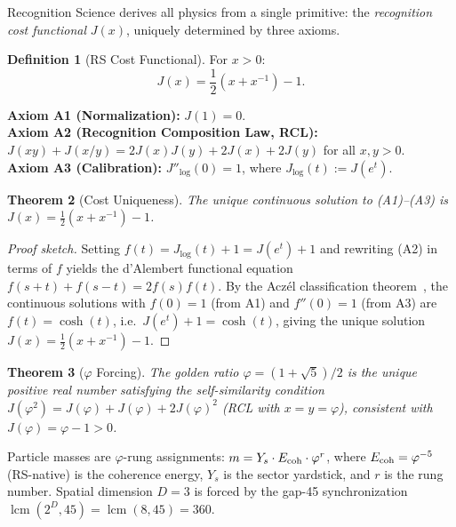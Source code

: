 \documentclass[12pt,a4paper]{article}
\newtheorem{theorem}{Theorem}[section]
\theoremstyle{definition}
\newtheorem{definition}[theorem]{Definition}
\theoremstyle{remark}
\begin{document}
Recognition Science derives all physics from a single primitive:
the \emph{recognition cost functional} $J(x)$, uniquely determined by
three axioms.

\begin{definition}[RS Cost Functional]
For $x > 0$:
\begin{equation}
  J(x) = \frac{1}{2}\!\left(x + x^{-1}\right) - 1.
\end{equation}
\end{definition}

\noindent\textbf{Axiom A1 (Normalization):} $J(1) = 0$.\\
\textbf{Axiom A2 (Recognition Composition Law, RCL):}
$J(xy) + J(x/y) = 2J(x)J(y) + 2J(x) + 2J(y)$ for all $x, y > 0$.\\
\textbf{Axiom A3 (Calibration):} $J''_{\log}(0) = 1$, where
$J_{\log}(t) := J(e^t)$.

\begin{theorem}[Cost Uniqueness]
\label{thm:unique}
The unique continuous solution to \textup{(A1)--(A3)} is
$J(x) = \tfrac{1}{2}(x + x^{-1}) - 1$.
\end{theorem}

\begin{proof}[Proof sketch]
Setting $f(t) = J_{\log}(t) + 1 = J(e^t) + 1$ and rewriting
\textup{(A2)} in terms of $f$ yields the d'Alembert functional equation
$f(s+t) + f(s-t) = 2f(s)f(t)$.  By the Acz\'el classification
theorem~\cite{Aczel1966}, the continuous solutions with $f(0) = 1$
(from A1) and $f''(0) = 1$ (from A3) are
$f(t) = \cosh(t)$, i.e.\ $J(e^t) + 1 = \cosh(t)$, giving the unique
solution $J(x) = \tfrac{1}{2}(x + x^{-1}) - 1$.
\end{proof}

\begin{theorem}[$\varphi$ Forcing]
\label{thm:phi}
The golden ratio $\varphi = (1+\sqrt{5})/2$ is the unique positive
real number satisfying the self-similarity condition
$J(\varphi^2) = J(\varphi) + J(\varphi) + 2J(\varphi)^2$
(RCL with $x = y = \varphi$), consistent with
$J(\varphi) = \varphi - 1 > 0$.
\end{theorem}

\noindent Particle masses are $\varphi$-rung assignments:
$m = Y_s \cdot E_{\rm coh} \cdot \varphi^r$,
where $E_{\rm coh} = \varphi^{-5}$ (RS-native) is the coherence energy,
$Y_s$ is the sector yardstick, and $r$ is the rung number.
Spatial dimension $D = 3$ is forced by the gap-45 synchronization
$\operatorname{lcm}(2^D, 45) = \operatorname{lcm}(8, 45) = 360$.
\end{document}
